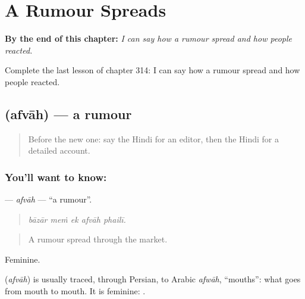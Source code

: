 
\chapter{A Rumour Spreads}
\label{ch:hi-a-rumour-spreads}

\begin{chapteropening}
\textbf{By the end of this chapter:} \emph{I can say how a rumour spread and how people reacted.}

Complete the last lesson of chapter 314: I can say how a rumour spread and how people reacted.
\end{chapteropening}

\section[\texorpdfstring{\hi{अफ़वाह} (afvāh)}{अफ़वाह (afvāh)}]{ (afvāh) — a rumour}

\label{lesson:HI-C314-afvah}



\begin{quote}
Before the new one: say the Hindi for an editor, then the Hindi for a detailed account.
\end{quote}

\subsection*{You'll want to know: }
\textbf{} — \emph{afvāh} — \textquotedblleft{}a rumour\textquotedblright{}.

\begin{quote}
    
\end{quote}

\begin{quote}
\emph{bāzār meṁ ek afvāh phailī.}
\end{quote}

\begin{quote}
A rumour spread through the market.
\end{quote}

Feminine.

\begin{cousinweb}
\textbf{} (\emph{afvāh}) is usually traced, through Persian, to Arabic \emph{afwāh}, \textquotedblleft{}mouths\textquotedblright{}: what goes from mouth to mouth. It is feminine: \textbf{ }.
\end{cousinweb}

